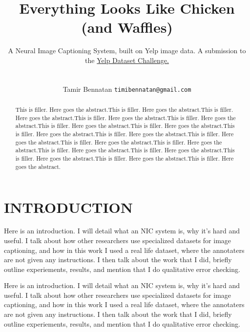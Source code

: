 \documentclass[letterpaper, 10 pt, conference]{ieeeconf}
\title{\LARGE \bf
Everything Looks Like Chicken (and Waffles)
}
\author{ \large A Neural Image Captioning System, built on Yelp image data. A submission to the  \href{https://www.yelp.com/dataset/challenge}{Yelp Dataset Challenge.} \\ \\
	\parbox{2 in}{\centering Tamir Bennatan
         {\tt\small timibennatan@gmail.com}
}}
\begin{document}
\nocite{vinyals}
\nocite{tanti1}
\nocite{tanti2}
\nocite{cho}
\nocite{kumar}
\nocite{xu}
\nocite{8k}
\nocite{30k}
\nocite{coco}
\nocite{wu}
\nocite{vgg}
\nocite{keras}
\nocite{imagenet}
\nocite{zipf}
\nocite{word2vec}

\maketitle
\thispagestyle{empty}
\pagestyle{empty}

\begin{abstract}
This is filler. Here goes the abstract.This is filler. Here goes the abstract.This is filler. Here goes the abstract.This is filler. Here goes the abstract.This is filler. Here goes the abstract.This is filler. Here goes the abstract.This is filler. Here goes the abstract.This is filler. Here goes the abstract.This is filler. Here goes the abstract.This is filler. Here goes the abstract.This is filler. Here goes the abstract.This is filler. Here goes the abstract.This is filler. Here goes the abstract.This is filler. Here goes the abstract.This is filler. Here goes the abstract.This is filler. Here goes the abstract.This is filler. Here goes the abstract.
\end{abstract}




\section{INTRODUCTION}

Here is an introduction. I will detail what an NIC system is, why it's hard and useful. I talk about how other researchers use specialized datasets for image captioning, and how in this work I used a real life dataset, where the annotaters are not given any instructions. I then talk about the work that I did, briefly outline experiements, results, and mention that I do qualitative error checking. 

Here is an introduction. I will detail what an NIC system is, why it's hard and useful. I talk about how other researchers use specialized datasets for image captioning, and how in this work I used a real life dataset, where the annotaters are not given any instructions. I then talk about the work that I did, briefly outline experiements, results, and mention that I do qualitative error checking. 
\end{document}
